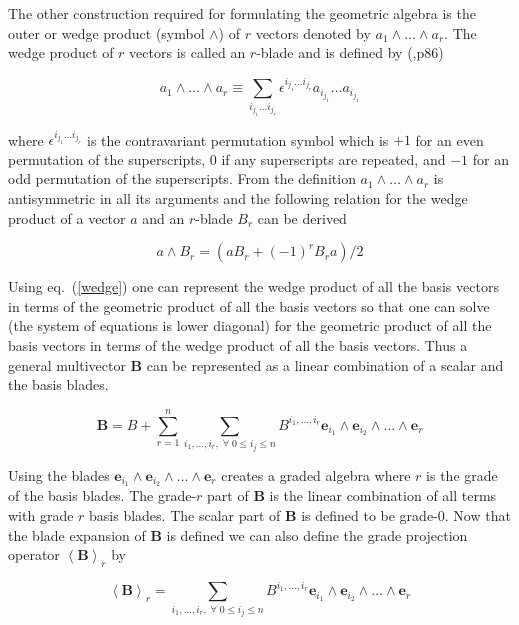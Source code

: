 \documentclass[12pt]{report}
\newcommand{\bm}[1]{\boldsymbol{#1}}
\newcommand{\llt}{\left <}
\newcommand{\rgt}{\right >}
\newcommand{\W}{\wedge}
\newcommand{\proj}[2]{\llt {#1} \rgt_{#2}}
\newcommand{\eb}{\bm{e}}
\begin{document}
The other construction required for formulating the geometric algebra is the outer or wedge product (symbol $\W$) of $r$
vectors denoted by $a_{1}\W\dots\W a_{r}$.  The wedge product of $r$ vectors is called an $r$-blade and is defined
by (\cite{Doran},p86)

   \begin{equation}
      a_{1}\W\dots\W a_{r} \equiv \sum_{i_{j_{1}}\dots i_{j_{r}}} \epsilon^{i_{j_{1}}\dots i_{j_{r}}}a_{i_{j_{1}}}\dots a_{i_{j_{1}}}
   \end{equation}

where $\epsilon^{i_{j_{1}}\dots i_{j_{r}}}$ is the contravariant permutation symbol which is $+1$ for an even permutation of the
superscripts, $0$ if any superscripts are repeated, and $-1$ for an odd permutation of the superscripts. From the definition
$a_{1}\W\dots\W a_{r}$ is antisymmetric in all its arguments and the following relation for the wedge product of a vector $a$ and an
$r$-blade $B_{r}$ can be derived

   \begin{equation}\label{wedge}
      a\W B_{r} = (aB_{r}+(-1)^{r}B_{r}a)/2
   \end{equation}

Using eq.~(\ref{wedge}) one can represent the wedge product of all the basis vectors
in terms of the geometric product of all the basis vectors so that one can solve (the system
of equations is lower diagonal) for the geometric product of all the basis vectors in terms of
the wedge product of all the basis vectors.  Thus a general multivector $\bm{B}$ can be
represented as a linear combination of a scalar and the basis blades.

   \begin{equation}
      \bm{B} = B + \sum_{r=1}^{n}\sum_{i_{1},\dots,i_{r},\;\forall\; 0\le i_{j} \le n} B^{i_{1},\dots,i_{r}}\eb_{i_{1}}\W \eb_{i_{2}}\W\dots\W \eb_{r}
   \end{equation}

Using the blades $\eb_{i_{1}}\W \eb_{i_{2}}\W\dots\W \eb_{r}$ creates a graded
algebra where $r$ is the grade of the basis blades.  The grade-$r$
part of $\bm{B}$ is the linear combination of all terms with
grade $r$ basis blades. The scalar part of $\bm{B}$ is defined to
be grade-$0$.  Now that the blade expansion of $\bm{B}$ is defined
we can also define the grade projection operator $\proj{\bm{B}}{r}$ by

   \begin{equation}
      \proj{\bm{B}}{r} = \sum_{i_{1},\dots,i_{r},\;\forall\; 0\le i_{j} \le n} B^{i_{1},\dots,i_{r}}\eb_{i_{1}}\W \eb_{i_{2}}\W\dots\W \eb_{r}
   \end{equation}
\end{document}
